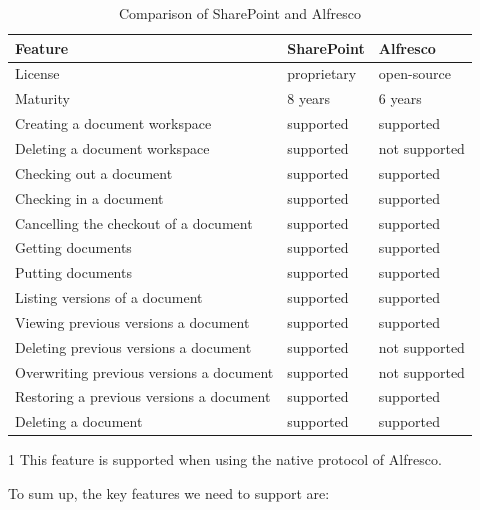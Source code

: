 \begin{table}[H]
\begin{threeparttable}
  \begin{center}
    \begin{tabular}{| l | l | l |}
    \hline
    \textbf{Feature} & \textbf{SharePoint} & \textbf{Alfresco} \\ \hline
    License & proprietary & open-source \\ \hline
    Maturity & 8 years \cite{sphist} & 6 years \\ \hline
    Creating a document workspace & supported & supported \\ \hline
    Deleting a document workspace & supported & not supported\tnote{1}\\ \hline
    Checking out a document & supported & supported \\ \hline
    Checking in a document & supported & supported \\ \hline
    Cancelling the checkout of a document & supported & supported \\ \hline
    Getting documents & supported & supported \\ \hline
    Putting documents & supported & supported \\ \hline
    Listing versions of a document & supported & supported \\ \hline
    Viewing previous versions a document & supported & supported \\ \hline
    Deleting previous versions a document & supported & not supported \\ \hline
    Overwriting previous versions a document & supported & not supported \\ \hline
    Restoring a previous versions a document & supported & supported \\ \hline
    Deleting a document & supported & supported \\ \hline
    \end{tabular}
    \begin{tablenotes}
    \item [1] This feature is supported when using the native protocol of Alfresco.
    \end{tablenotes}
  \end{center}
  \caption{Comparison of SharePoint and Alfresco}
  \label{tab:background-comparison}
\end{threeparttable}
\end{table}

To sum up, the key features we need to support are:

